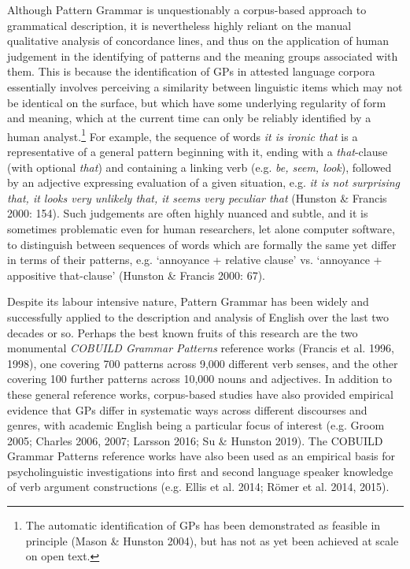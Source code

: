 \documentclass[12pt]{article}
\newenvironment{styleStandard}{\setlength\leftskip{0cm}\setlength\rightskip{0cm plus 1fil}\setlength\parindent{0cm}\setlength\parfillskip{0pt plus 1fil}\setlength\parskip{0in plus 1pt}\writerlistparindent\writerlistleftskip\leavevmode\normalfont\normalsize\writerlistlabel\ignorespaces}{\unskip\vspace{0.111in plus 0.0111in}\par}
\newcommand\writerlistleftskip{}
\newcommand\writerlistparindent{}
\newcommand\writerlistlabel{}
\begin{document}
\begin{styleStandard}
Although Pattern Grammar is unquestionably a corpus-based approach to grammatical description, it is nevertheless highly reliant on the manual qualitative analysis of concordance lines, and thus on the application of human judgement in the identifying of patterns and the meaning groups associated with them. This is because the identification of GPs in attested language corpora essentially involves perceiving a similarity between linguistic items which may not be identical on the surface, but which have some underlying regularity of form and meaning, which at the current time can only be reliably identified by a human analyst.\footnote{The automatic identification of GPs has been demonstrated as feasible in principle (Mason \& Hunston 2004), \textrm{but has not as yet been achieved at scale on open text.}} For example, the sequence of words \textit{it is ironic that} is a representative of a general pattern beginning with it, ending with a \textit{that}{}-clause (with optional \textit{that}) and containing a linking verb (e.g. \textit{be, seem, look}), followed by an adjective expressing evaluation of a given situation, e.g. \textit{it is not surprising that, it looks very unlikely that, it seems very peculiar that} (Hunston \& Francis 2000: 154). Such judgements are often highly nuanced and subtle, and it is sometimes problematic even for human researchers, let alone computer software, to distinguish between sequences of words which are formally the same yet differ in terms of their patterns, e.g. ‘annoyance + relative clause’ vs. ‘annoyance + appositive that-clause’ (Hunston \& Francis 2000: 67). 
\end{styleStandard}

\begin{styleStandard}
Despite its labour intensive nature, Pattern Grammar has been widely and successfully applied to the description and analysis of English over the last two decades or so. Perhaps the best known fruits of this research are the two monumental \textit{COBUILD Grammar Patterns} reference works (Francis et al. 1996, 1998), one covering 700 patterns across 9,000 different verb senses, and the other covering 100 further patterns across 10,000 nouns and adjectives. In addition to these general reference works, corpus-based studies have also provided empirical evidence that GPs differ in systematic ways across different discourses and genres, with academic English being a particular focus of interest (e.g. Groom 2005; Charles 2006, 2007; Larsson 2016; Su \& Hunston 2019). The COBUILD Grammar Patterns reference works have also been used as an empirical basis for psycholinguistic investigations into first and second language speaker knowledge of verb argument constructions (e.g. Ellis et al. 2014; R\"{o}mer et al. 2014, 2015).
\end{styleStandard}
\end{document}
